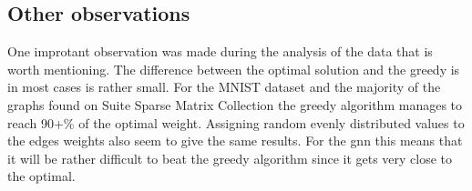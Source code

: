 \subsection{Other observations}

One improtant observation was made during the analysis of the data that is worth mentioning. The difference between the optimal solution and the greedy is in most cases is rather small. For the MNIST dataset and the majority of the graphs found on Suite Sparse Matrix Collection the greedy algorithm manages to reach 90+\% of the optimal weight. Assigning random evenly distributed values to the edges weights also seem to give the same results. For the \gls{gnn} this means that it will be rather difficult to beat the greedy algorithm since it gets very close to the optimal.
